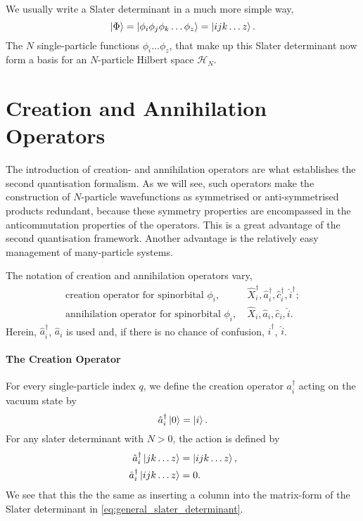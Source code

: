 We usually write a Slater determinant in a much more simple way,
    \begin{equation}
        \ket{\Phi} = \ket{\phi_i \phi_j \phi_k \dots \phi_z} = \ket{ijk \dots z}.
    \end{equation}
The $N$ single-particle functions $\phi_i\dots\phi_z$, that make up this Slater determinant
now form a basis for an $N$-particle Hilbert space $\mathcal{H}_N$. 

\section{Creation and Annihilation Operators}
   
    The introduction of creation- and annihilation operators are what establishes
    the second quantisation formalism. As we will see, such operators make the 
    construction of $N$-particle wavefunctions as symmetrised or anti-symmetrised
    products redundant, because these symmetry properties are encompassed in the 
    anticommutation properties of the operators. This is a great advantage of the 
    second quantisation framework. Another advantage is the relatively easy 
    management of many-particle systems. 

    The notation of creation and annihilation operators vary,
    \begin{align*}
        \text{creation operator for spinorbital } \phi_i, &\ 
        \hat{X}_i^\dagger, \hat{a}^\dagger_i, \hat{c}_i^\dagger, \hat{i}^\dagger; \\
        \text{annihilation operator for spinorbital } \phi_i, &\ 
        \hat{X}_i, \hat{a}_i, \hat{c}_i, \hat{i}.       
    \end{align*}
    Herein, $\hat{a}_i^\dagger$, $\hat{a}_i$ is used and, if there is no chance of 
    confusion, $\hat{i}^\dagger$, $\hat{i}$.

    \paragraph{The Creation Operator}
    For every single-particle index $q$,
    we define the creation operator
    $a_i^\dagger$ acting on the vacuum state by
    \begin{equation}
        \hat{a}_i^\dagger \ket{0} = \ket{i}.
    \end{equation}
    For any slater determinant with $N > 0$, the action is defined by
    \begin{align}
        \hat{a}_i^\dagger\ket{jk \dots z} &= \ket{ijk \dots z}, \\
        \hat{a}_i^\dagger\ket{ijk \dots z} &= 0.
    \end{align}
    We see that this the the same as inserting a column into the matrix-form of the 
    Slater determinant in \autoref{eq:general_slater_determinant}.

